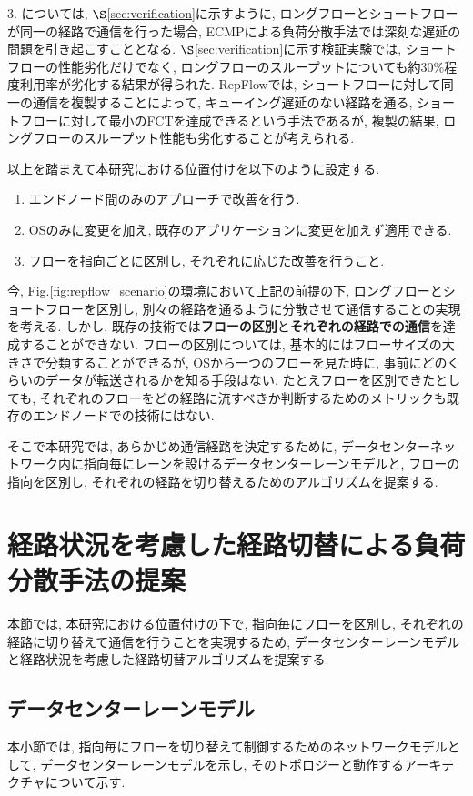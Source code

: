 3. については, $\S$\ref{sec:verification}に示すように, ロングフローとショートフローが同一の経路で通信を行った場合, 
ECMPによる負荷分散手法では深刻な遅延の問題を引き起こすこととなる. 
$\S$\ref{sec:verification}に示す検証実験では, ショートフローの性能劣化だけでなく,
ロングフローのスループットについても約30\%程度利用率が劣化する結果が得られた. 
RepFlowでは, ショートフローに対して同一の通信を複製することによって, キューイング遅延のない経路を通る,
ショートフローに対して最小のFCTを達成できるという手法であるが, 複製の結果, ロングフローのスループット性能も劣化することが考えられる. 

以上を踏まえて本研究における位置付けを以下のように設定する. 
\begin{enumerate}
\item エンドノード間のみのアプローチで改善を行う.  
\item OSのみに変更を加え, 既存のアプリケーションに変更を加えず適用できる. 
\item フローを指向ごとに区別し, それぞれに応じた改善を行うこと. 
\end{enumerate} 

今, Fig.\ref{fig:repflow_scenario}の環境において上記の前提の下, ロングフローとショートフローを区別し, 別々の経路を通るように分散させて通信することの実現を考える. 
しかし, 既存の技術では{\bf フローの区別}と{\bf それぞれの経路での通信}を達成することができない. 
フローの区別については, 基本的にはフローサイズの大きさで分類することができるが, OSから一つのフローを見た時に,
事前にどのくらいのデータが転送されるかを知る手段はない. 
たとえフローを区別できたとしても, それぞれのフローをどの経路に流すべきか判断するためのメトリックも既存のエンドノードでの技術にはない. 

そこで本研究では, あらかじめ通信経路を決定するために, データセンターネットワーク内に指向毎にレーンを設けるデータセンターレーンモデルと,
フローの指向を区別し, それぞれの経路を切り替えるためのアルゴリズムを提案する. 

\section{経路状況を考慮した経路切替による負荷分散手法の提案}
本節では, 本研究における位置付けの下で, 指向毎にフローを区別し, それぞれの経路に切り替えて通信を行うことを実現するため,
データセンターレーンモデルと経路状況を考慮した経路切替アルゴリズムを提案する. 

\subsection{データセンターレーンモデル}
\label{subsec:lane_model}
本小節では, 指向毎にフローを切り替えて制御するためのネットワークモデルとして, データセンターレーンモデルを示し,
そのトポロジーと動作するアーキテクチャについて示す. 

